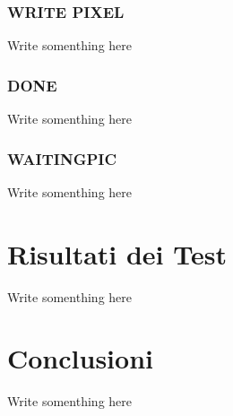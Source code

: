 \documentclass{article}
\begin{document}
\subsubsection{WRITE PIXEL}
Write somenthing here

\subsubsection{DONE}
Write somenthing here

\subsubsection{WAITINGPIC}
Write somenthing here

\section{Risultati dei Test}
Write somenthing here

\section{Conclusioni}
Write somenthing here
\end{document}
